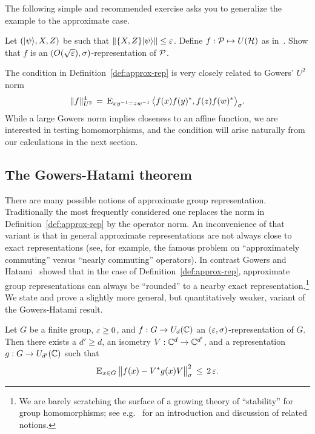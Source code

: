 The following simple and recommended exercise asks you to generalize the example to the approximate case. 

\begin{exercise}
\label{ex:wh-2}
Let $(|\psi\rangle,X,Z)$ be such that $\|\{X,Z\}|\psi\rangle\|\leq \varepsilon$. Define $f:\mathcal{P} \mapsto U(\mathcal{H})$ as in~. Show that $f$ is an $(O(\sqrt{\varepsilon}),\sigma)$-representation of $\mathcal{P}$. 
\end{exercise}

\begin{remark}
The condition  in Definition~\ref{def:approx-rep} is very closely related to Gowers' $U^2$ norm
$$\|f\|_{U^2}^4 \,=\, \textsc{E}_{xy^{-1}=zw^{-1}}\, \big\langle f(x)f(y)^* ,f(z)f(w)^* \big\rangle_\sigma.$$
While a large Gowers norm implies closeness to an affine function, we are interested in testing homomorphisms, and the condition  will arise naturally from our calculations in the next section. 
\end{remark}

\subsection{The Gowers-Hatami theorem}

There are many possible notions of approximate group representation. Traditionally the most frequently considered one replaces the norm in Definition~\ref{def:approx-rep} by the operator norm. An inconvenience of that variant is that in general approximate representations are not always close to exact representations (see, for example, the famous problem on ``approximately commuting'' versus ``nearly commuting'' operators). In contrast 
Gowers and Hatami~\cite{gowers2017inverse} showed that in the case of Definition~\ref{def:approx-rep}, approximate group representations can always be ``rounded'' to a nearby exact representation.\footnote{We are barely scratching the surface of a growing theory of ``stability'' for group homomorphisms; see e.g.~\cite{becker2020stability} for an introduction and discussion of related notions.} 
We state and prove a slightly more general, but quantitatively weaker, variant of the Gowers-Hatami result.

\begin{theorem}
\label{thm:gh}
Let $G$ be a finite group, $\varepsilon\geq 0$, and $f:G\to U_d(\mathbb{C})$ an $(\varepsilon,\sigma)$-representation of $G$. Then there exists a $d'\geq d$, an isometry $V:\mathbb{C}^d\to \mathbb{C}^{d'}$, and a representation $g:G\to U_{d'}(\mathbb{C})$ such that 
$$\textsc{E}_{x\in G}\, \big\| f(x) - V^*g(x)V \big\|_\sigma^2\, \leq\, 2\,\varepsilon.$$ 
\end{theorem}

